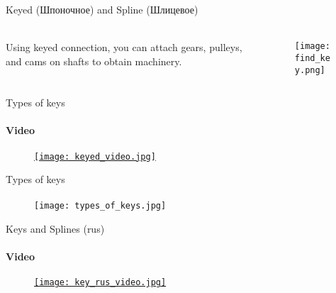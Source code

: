 \documentclass[aspectratio=169]{beamer}
\begin{document}
\begin{frame}[t]{Keyed (Шпоночное) and Spline (Шлицевое)}
    \framesubtitle{}
    \begin{columns}[T,onlytextwidth]
        \begin{column}{0.49\textwidth}
            Using keyed connection, you can attach gears, pulleys, and cams on shafts to obtain machinery.
        \end{column}
        \begin{column}{0.49\textwidth}
            \begin{figure}[H]
                \centering\texttt{[image: find\_key.png]}
                \label{fig:find_key.png}
            \end{figure}
        \end{column}
    \end{columns}
\end{frame}

\begin{frame}[t]{Types of keys}
    \framesubtitle{Video}
    \vspace{-0.6cm}
    \begin{figure}[H]
        \href{https://youtu.be/F3c6GPAFZMI}{
            \centering\texttt{[image: keyed\_video.jpg]}}
        \label{fig:keyed_video.jpg}
    \end{figure}
\end{frame}

\begin{frame}[t]{Types of keys}
    \framesubtitle{}
    \vspace{-0.6cm}
    \begin{figure}[H]
        \centering\texttt{[image: types\_of\_keys.jpg]}
        \label{fig:types_of_keys.jpg}
    \end{figure}
\end{frame}

\begin{frame}[t]{Keys and Splines (rus)}
    \framesubtitle{Video}
    \vspace{-0.6cm}
    \begin{figure}[H]
        \href{https://youtu.be/-bktOSXtLB8}{
            \centering\texttt{[image: key\_rus\_video.jpg]}}
        \label{fig:key_rus_video.jpg}
    \end{figure}
\end{frame}
\end{document}
